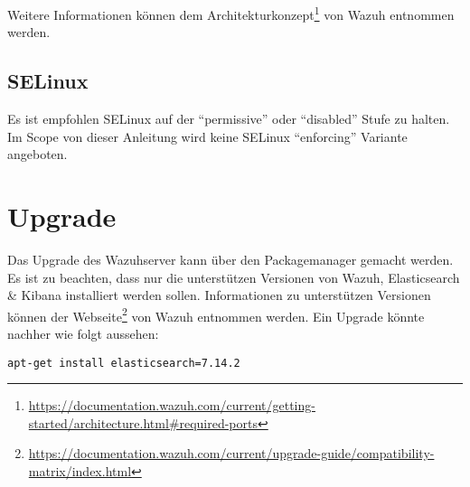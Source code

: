 Weitere Informationen können dem Architekturkonzept\footnote{\href{https://documentation.wazuh.com/current/getting-started/architecture.html\#required-ports}{https://documentation.wazuh.com/current/getting-started/architecture.html\#required-ports}} von Wazuh entnommen werden.\\


\subsection{SELinux}
Es ist empfohlen SELinux auf der ``permissive'' oder ``disabled'' Stufe zu halten. Im Scope von dieser Anleitung wird keine SELinux ``enforcing'' Variante angeboten.

\section{Upgrade}
Das Upgrade des Wazuhserver kann über den Packagemanager gemacht werden.
Es ist zu beachten, dass nur die unterstützen Versionen von Wazuh, Elasticsearch \& Kibana installiert werden sollen.
Informationen zu unterstützen Versionen können der Webseite\footnote{\href{https://documentation.wazuh.com/current/upgrade-guide/compatibility-matrix/index.html}{https://documentation.wazuh.com/current/upgrade-guide/compatibility-matrix/index.html}} von Wazuh entnommen werden. Ein Upgrade könnte nachher wie folgt aussehen:
\begin{lstlisting}
apt-get install elasticsearch=7.14.2
\end{lstlisting}


